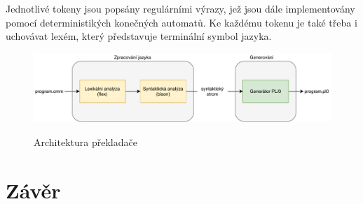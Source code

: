 \documentclass[12pt, a4paper]{article}
\let\oldsection\section
\renewcommand\section{\clearpage\oldsection}
\begin{document}
Jednotlivé tokeny jsou popsány regulárními výrazy, jež jsou dále implementovány pomocí deterministikých konečných automatů. Ke každému tokenu je také třeba i uchovávat lexém, který představuje terminální symbol jazyka.



\begin{figure}[!ht]
    \centering
    {\includegraphics[width=\textwidth]{pdf/architecture.pdf}}
    \caption{Architektura překladače}
    \label{fig:screen-transition-diagram}
\end{figure}

\section{Závěr}	

\end{document}
